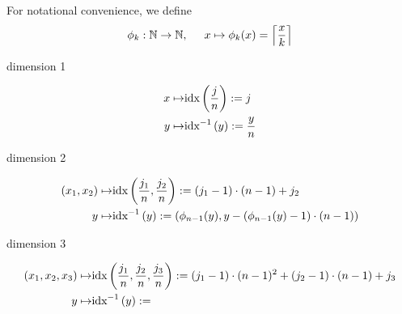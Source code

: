 For notational convenience, we define
\begin{align*}
    \phi_k : \mathbb{N} \rightarrow \mathbb{N}, \hspace{0.5cm}
    x \mapsto \phi_k (x) = \ceil*{\frac{x}{k}}
\end{align*}

dimension 1

\begin{align*}
    x \mapsto& \idx{\frac{j}{n}} := j \\
    y \mapsto& \idxi{y} := \frac{y}{n}
\end{align*}

dimension 2

\begin{align*}
    (x_1, x_2) \mapsto& \idx{\frac{j_1}{n}, \frac{j_2}{n}}
    := (j_1 - 1) \cdot (n - 1) + j_2 \\
    y \mapsto& \idxi{y} := \left( \phi_{n-1}(y),
    y - \left( \phi_{n-1}(y) - 1 \right) \cdot (n - 1) \right)
\end{align*}

dimension 3

\begin{align*}
    (x_1, x_2, x_3) \mapsto& \idx{\frac{j_1}{n}, \frac{j_2}{n}, \frac{j_3}{n}}
    := (j_1 - 1) \cdot (n - 1)^2 + (j_2 - 1) \cdot (n - 1) + j_3 \\
    y \mapsto& \idxi{y} := 
\end{align*}
